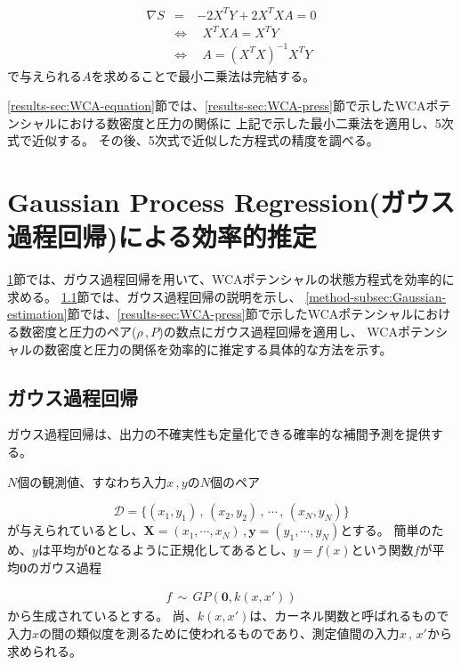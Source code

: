 \documentclass[titlepage]{jsreport}
\begin{document}
{{{\large
\begin{eqnarray}
    {\nabla}S&=&-2X^TY+2X^TXA=0\nonumber\\
    &{\Leftrightarrow}&{\ }{\ }X^TXA=X^TY\nonumber\\
    &{\Leftrightarrow}&{\ }{\ }A=(X^TX)^{-1}X^TY\label{eq:normal-equation}
\end{eqnarray}
\normalsize
で与えられる$A$を求めることで最小二乗法は完結する\cite{least-squares}。

\ref{results-sec:WCA-equation}節では、\ref{results-sec:WCA-press}節で示したWCAポテンシャルにおける数密度と圧力の関係に
上記で示した最小二乗法を適用し、5次式で近似する。
その後、5次式で近似した方程式の精度を調べる。


\section{Gaussian Process Regression(ガウス過程回帰)による効率的推定}\label{method-sec:Gauss}
\ref{method-sec:Gauss}節では、ガウス過程回帰を用いて、WCAポテンシャルの状態方程式を効率的に求める。
\ref{method-subsec:Gauss}節では、ガウス過程回帰の説明を示し、
\ref{method-subsec:Gaussian-estimation}節では、\ref{results-sec:WCA-press}節で示したWCAポテンシャルにおける数密度と圧力のペア($\rho$\,,\,$P$)の数点にガウス過程回帰を適用し、
WCAポテンシャルの数密度と圧力の関係を効率的に推定する具体的な方法を示す。


\subsection{ガウス過程回帰}\label{method-subsec:Gauss}
ガウス過程回帰は、出力の不確実性も定量化できる確率的な補間予測を提供する\cite{machine-learning}。


$N$個の観測値、すなわち入力$x$\,,\,$y$の$N$個のペア

\large
\[
    \mathcal{D}=\{(x_1,y_1)\,,\,(x_2,y_2)\,,\,\cdots\,,\,(x_N,y_N)\}
\]
\normalsize
が与えられているとし、$\bm{X}=(x_1,\cdots,x_N)$\,,\,$\bm{y}=(y_1,\cdots,y_N)$とする。
簡単のため、$y$は平均が$\bm{0}$となるように正規化してあるとし、$y=f(x)$という関数$f$が平均$\bm{0}$のガウス過程

\large
\begin{eqnarray}
    f\,{\sim}\,GP(\bm{0},k(x,x'))\nonumber
\end{eqnarray}
\normalsize
から生成されているとする。
尚、$k(x,x')$は、カーネル関数と呼ばれるもので入力$x$の間の類似度を測るために使われるものであり\cite{Gauss-machine-learning}、測定値間の入力$x\,,\,x'$から求められる。

}}}
\end{document}
